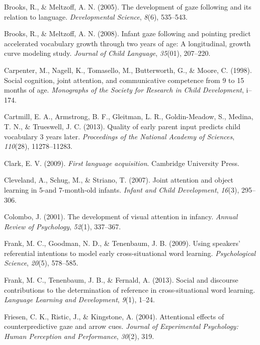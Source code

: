 \documentclass[authoryear, review]{elsarticle}
\begin{document}
\hypertarget{ref-brooks2005development}{}
Brooks, R., \& Meltzoff, A. N. (2005). The development of gaze following
and its relation to language. \emph{Developmental Science}, \emph{8}(6),
535--543.

\hypertarget{ref-brooks2008infant}{}
Brooks, R., \& Meltzoff, A. N. (2008). Infant gaze following and
pointing predict accelerated vocabulary growth through two years of age:
A longitudinal, growth curve modeling study. \emph{Journal of Child
Language}, \emph{35}(01), 207--220.

\hypertarget{ref-carpenter1998social}{}
Carpenter, M., Nagell, K., Tomasello, M., Butterworth, G., \& Moore, C.
(1998). Social cognition, joint attention, and communicative competence
from 9 to 15 months of age. \emph{Monographs of the Society for Research
in Child Development}, i--174.

\hypertarget{ref-cartmill2013quality}{}
Cartmill, E. A., Armstrong, B. F., Gleitman, L. R., Goldin-Meadow, S.,
Medina, T. N., \& Trueswell, J. C. (2013). Quality of early parent input
predicts child vocabulary 3 years later. \emph{Proceedings of the
National Academy of Sciences}, \emph{110}(28), 11278--11283.

\hypertarget{ref-clark2009first}{}
Clark, E. V. (2009). \emph{First language acquisition}. Cambridge
University Press.

\hypertarget{ref-cleveland2007joint}{}
Cleveland, A., Schug, M., \& Striano, T. (2007). Joint attention and
object learning in 5-and 7-month-old infants. \emph{Infant and Child
Development}, \emph{16}(3), 295--306.

\hypertarget{ref-colombo2001development}{}
Colombo, J. (2001). The development of visual attention in infancy.
\emph{Annual Review of Psychology}, \emph{52}(1), 337--367.

\hypertarget{ref-frank2009using}{}
Frank, M. C., Goodman, N. D., \& Tenenbaum, J. B. (2009). Using
speakers' referential intentions to model early cross-situational word
learning. \emph{Psychological Science}, \emph{20}(5), 578--585.

\hypertarget{ref-frank2013social}{}
Frank, M. C., Tenenbaum, J. B., \& Fernald, A. (2013). Social and
discourse contributions to the determination of reference in
cross-situational word learning. \emph{Language Learning and
Development}, \emph{9}(1), 1--24.

\hypertarget{ref-friesen2004attentional}{}
Friesen, C. K., Ristic, J., \& Kingstone, A. (2004). Attentional effects
of counterpredictive gaze and arrow cues. \emph{Journal of Experimental
Psychology: Human Perception and Performance}, \emph{30}(2), 319.
\end{document}
